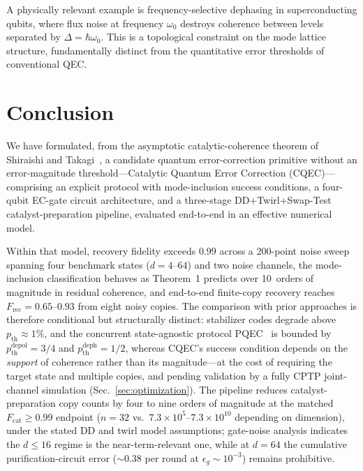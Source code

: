 \documentclass[a4paper,twocolumn]{quantumarticle}
\begin{document}
A physically relevant example is frequency-selective dephasing in superconducting qubits, where flux noise at frequency $\omega_0$ destroys coherence between levels separated by $\Delta = \hbar\omega_0$.
This is a topological constraint on the mode lattice structure, fundamentally distinct from the quantitative error thresholds of conventional QEC.


\section{Conclusion}
\label{sec:conclusion}

We have formulated, from the asymptotic catalytic-coherence theorem of Shiraishi and Takagi~\cite{Shiraishi2024}, a candidate quantum error-correction primitive without an error-magnitude threshold---Catalytic Quantum Error Correction (CQEC)---comprising an explicit protocol with mode-inclusion success conditions, a four-qubit EC-gate circuit architecture, and a three-stage DD+Twirl+Swap-Test catalyst-preparation pipeline, evaluated end-to-end in an effective numerical model.

Within that model, recovery fidelity exceeds $0.99$ across a 200-point noise sweep spanning four benchmark states ($d = 4$--$64$) and two noise channels, the mode-inclusion classification behaves as Theorem~1 predicts over 10~orders of magnitude in residual coherence, and end-to-end finite-copy recovery reaches $F_\mathrm{rec} = 0.65$--$0.93$ from eight noisy copies.
The comparison with prior approaches is therefore conditional but structurally distinct: stabilizer codes degrade above $p_\mathrm{th} \approx 1\%$, and the concurrent state-agnostic protocol PQEC~\cite{Raghoonanan2026} is bounded by $p_\mathrm{th}^\mathrm{depol} = 3/4$ and $p_\mathrm{th}^\mathrm{deph} = 1/2$, whereas CQEC's success condition depends on the \emph{support} of coherence rather than its magnitude---at the cost of requiring the target state and multiple copies, and pending validation by a fully CPTP joint-channel simulation (Sec.~\ref{sec:optimization}).
The pipeline reduces catalyst-preparation copy counts by four to nine orders of magnitude at the matched $F_\mathrm{cat} \geq 0.99$ endpoint ($n = 32$ vs.\ $7.3 \times 10^{5}$--$7.3 \times 10^{10}$ depending on dimension), under the stated DD and twirl model assumptions; gate-noise analysis indicates the $d \leq 16$ regime is the near-term-relevant one, while at $d = 64$ the cumulative purification-circuit error ($\sim\!0.38$ per round at $\epsilon_g \sim 10^{-3}$) remains prohibitive.
\end{document}
